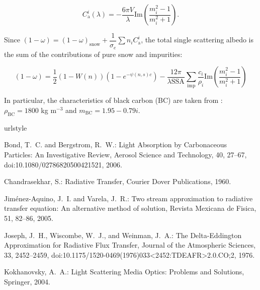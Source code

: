 \documentclass[a4paper,11pt]{article}
\begin{document}
\begin{equation}
C_{\textrm{a}}^{i}(\lambda)=-\dfrac{6\pi V}{\lambda}\textrm{Im}\left(\dfrac{m_i^2-1}{m_i^2+1}\right).
\end{equation}

Since $(1-\omega)=(1-\omega)_{\textrm{snow}}+\dfrac{1}{\sigma_e}\displaystyle\sum\limits n_iC_{\textrm{a}}^{i}$, the total single scattering albedo is the sum of the contributions of pure snow and impurities:

\begin{equation}
(1-\omega)=\dfrac{1}{2}(1-W(n))(1-e^{-\psi(n,s) c})-\dfrac{12\pi}{\lambda\textrm{SSA}}\displaystyle\sum_{\textrm{imp}}\dfrac{c_{i}}{\rho_i}\textrm{Im}\left(\dfrac{m_i^2-1}{m_i^2+1}\right)
\end{equation}

In particular, the characteristics of black carbon (BC) are taken from \cite{bond_light_2006}: $\rho_{\textrm{BC}}=1800$ kg m$^{-3}$ and $m_{\textrm{BC}}=1.95-0.79i$.



\begin{thebibliography}{5}
\providecommand{\natexlab}[1]{#1}
\providecommand{\url}[1]{{\tt #1}}
\providecommand{\urlprefix}{URL }
\expandafter\ifx\csname urlstyle\endcsname\relax
  \providecommand{\doi}[1]{doi:\discretionary{}{}{}#1}\else
  \providecommand{\doi}{doi:\discretionary{}{}{}\begingroup
  \urlstyle{rm}\Url}\fi

Bond, T.~C. and Bergstrom, R.~W.: Light Absorption by Carbonaceous Particles:
  An Investigative Review, Aerosol Science and Technology, 40, 27--67,
  \doi{10.1080/02786820500421521}, 2006.

Chandrasekhar, S.: Radiative Transfer, Courier Dover Publications, 1960.

Jim{\'e}nez-Aquino, J.~I. and Varela, J.~R.: Two stream approximation to
  radiative transfer equation: An alternative method of solution, Revista
  Mexicana de Fisica, 51, 82--86, 2005.

Joseph, J.~H., Wiscombe, W.~J., and Weinman, J.~A.: The Delta-Eddington
  Approximation for Radiative Flux Transfer, Journal of the Atmospheric
  Sciences, 33, 2452--2459,
  \doi{10.1175/1520-0469(1976)033<2452:TDEAFR>2.0.CO;2}, 1976.

Kokhanovsky, A.~A.: Light Scattering Media Optics: Problems and Solutions,
  Springer, 2004.

\end{thebibliography}
\end{document}
